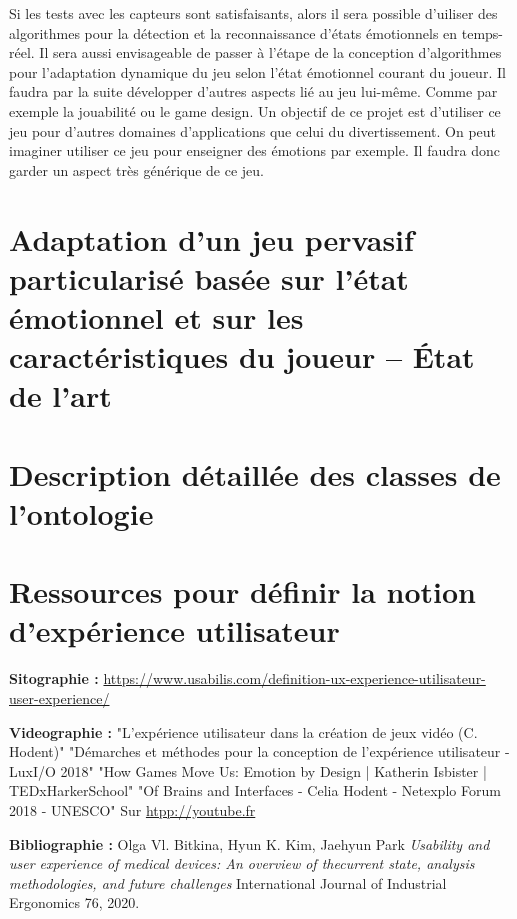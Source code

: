 \documentclass{article}
\begin{document}
	Si les tests avec les capteurs sont satisfaisants, alors il sera possible d'uiliser des algorithmes pour la détection et la reconnaissance d'états émotionnels en temps-réel.
	Il sera aussi envisageable de passer à l'étape de la conception d'algorithmes pour l'adaptation dynamique du jeu selon l'état émotionnel courant du joueur.
	Il faudra par la suite développer d'autres aspects lié au jeu lui-même.
	Comme par exemple la jouabilité ou le game design.
	Un objectif de ce projet est d'utiliser ce jeu pour d'autres domaines d'applications que celui du divertissement.
	On peut imaginer utiliser ce jeu pour enseigner des émotions par exemple.
	Il faudra donc garder un aspect très générique de ce jeu.


\newpage
\renewcommand{\contentsname}{Annexes}\appendix
\section{Adaptation d’un jeu pervasif particularisé basée sur l'état émotionnel et sur les caractéristiques du joueur – État de l’art}\label{ann:eda}
	

\section{Description détaillée des classes de l'ontologie}\label{ann:detailclasses}
	

\section{Ressources pour définir la notion d'expérience utilisateur}\label{ann:ux}
	\textbf{Sitographie :}\newline
	\href{https://www.usabilis.com/definition-ux-experience-utilisateur-user-experience/}{https://www.usabilis.com/definition-ux-experience-utilisateur-user-experience/}\par
	\textbf{Videographie :}\newline
	"L'expérience utilisateur dans la création de jeux vidéo (C. Hodent)"\newline
	"Démarches et méthodes pour la conception de l'expérience utilisateur - LuxI/O 2018"\newline
	"How Games Move Us: Emotion by Design | Katherin Isbister | TEDxHarkerSchool"\newline
	"Of Brains and Interfaces - Celia Hodent - Netexplo  Forum 2018 - UNESCO"
	Sur \href{http://youtube.fr}{htpp://youtube.fr}\par
	\textbf{Bibliographie :}\newline
	Olga Vl. Bitkina, Hyun K. Kim, Jaehyun Park \textit{Usability and user experience of medical devices: An overview of thecurrent state, analysis methodologies, and future challenges} International Journal of Industrial Ergonomics 76, 2020.
\end{document}
